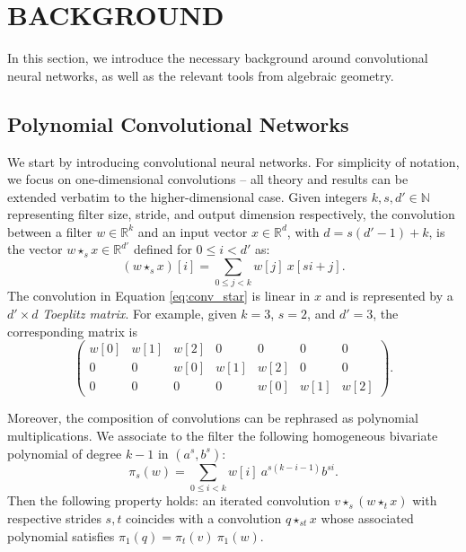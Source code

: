 \documentclass[twoside]{article}
\theoremstyle{plain}%
\theoremstyle{definition}
\theoremstyle{remark}
\newcommand{\conv}[1]{\star_{#1}}
\begin{document}
\section{BACKGROUND}\label{sec:back}
In this section, we introduce the necessary background around convolutional neural networks, as well as the relevant tools from algebraic geometry. 

\subsection{Polynomial Convolutional Networks}\label{sec:polconvs}
We start by introducing convolutional neural networks. For simplicity of notation, we focus on one-dimensional convolutions -- all theory and results can be extended verbatim to the higher-dimensional case. Given integers $k, s, d' \in \mathbb{N}$ representing filter size, stride, and output dimension respectively, the convolution between a filter $w \in \mathbb{R}^k$ and an input vector $x \in \mathbb{R}^d$, with $d = s(d' -  1) + k$, is the vector $ w \conv{s} x \in \mathbb{R}^{d'}$ defined for $ 0 \leq i < d'$ as: 
\begin{equation}
\label{eq:conv_star}
 (w \conv{s} x)[i] =   \sum_{0 \leq j < k} w[j] \  x[si + j].
\end{equation}
The convolution in Equation \eqref{eq:conv_star} is linear in $x$ and is represented by a $d' \times d$  \emph{Toeplitz matrix}. For example,  given $k=3$, $s=2$, and $d'=3$, the corresponding matrix is 
\[\begin{pmatrix}
    w[0]&w[1]&w[2]&0&0&0&0\\
    0&0&w[0]&w[1]&w[2]&0&0\\
    0&0&0&0&w[0]&w[1]&w[2]
\end{pmatrix}.\]

Moreover, the composition of convolutions can be rephrased as polynomial multiplications. We associate to the filter the following homogeneous bivariate polynomial of degree $k-1$ in $(a^s,b^s)$: 
\begin{equation}
    \label{eq:poly_correspondence}
    \pi_s(w) = \sum_{0 \leq i < k}w[i] \ a^{s(k-i-1)}b^{si} .
\end{equation}
Then the following property holds: an iterated convolution $v \conv{s} (w \conv{t} x)$ with respective strides $s, t$ coincides with a convolution $q \conv{st} x$ whose associated polynomial satisfies $\pi_{1}(q) = \pi_{t}(v) \ \pi_{1}(w)$.  
\end{document}
